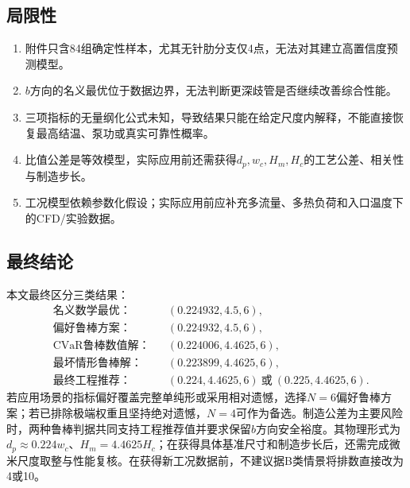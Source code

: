 \documentclass[UTF8,12pt,a4paper]{ctexart}
\begin{document}
\subsection{局限性}
\begin{enumerate}
  \item 附件只含84组确定性样本，尤其无针肋分支仅4点，无法对其建立高置信度预测模型。
  \item $b$方向的名义最优位于数据边界，无法判断更深歧管是否继续改善综合性能。
  \item 三项指标的无量纲化公式未知，导致结果只能在给定尺度内解释，不能直接恢复最高结温、泵功或真实可靠性概率。
  \item 比值公差是等效模型，实际应用前还需获得$d_p,w_c,H_m,H_c$的工艺公差、相关性与制造步长。
  \item 工况模型依赖参数化假设；实际应用前应补充多流量、多热负荷和入口温度下的CFD/实验数据。
\end{enumerate}

\subsection{最终结论}
本文最终区分三类结果：
\begin{equation}
\begin{aligned}
&\text{名义数学最优：}&& (0.224932,4.5,6),\\
&\text{偏好鲁棒方案：}&& (0.224932,4.5,6),\\
&\text{CVaR鲁棒数值解：}&& (0.224006,4.4625,6),\\
&\text{最坏情形鲁棒解：}&& (0.223899,4.4625,6),\\
&\text{最终工程推荐：}&& (0.224,4.4625,6)\ \text{或}\ (0.225,4.4625,6).
\end{aligned}
\end{equation}
若应用场景的指标偏好覆盖完整单纯形或采用相对遗憾，选择$N=6$偏好鲁棒方案；若已排除极端权重且坚持绝对遗憾，$N=4$可作为备选。制造公差为主要风险时，两种鲁棒判据共同支持工程推荐值并要求保留$b$方向安全裕度。其物理形式为$d_p\approx0.224w_c$、$H_m=4.4625H_c$；在获得具体基准尺寸和制造步长后，还需完成微米尺度取整与性能复核。在获得新工况数据前，不建议据B类情景将排数直接改为4或10。
\end{document}
